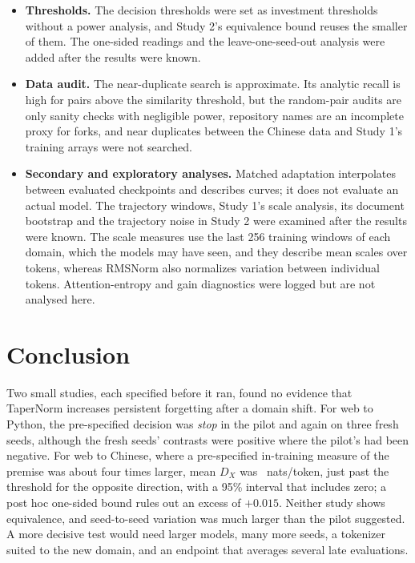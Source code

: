 \documentclass[11pt]{article}
\begin{document}
\begin{itemize}[leftmargin=1.4em,itemsep=2pt]
        primary run and the appearance of seed 101's endpoint values in the run's live log
        (\cref{sec:prespec}); the evidence that its analysis was fixed in advance is the configuration hash logged
        before any outcome and the unchanged runner hash. For Study 2, the Bitcoin attestation postdates the
        Chinese endpoints of seeds 101--103, and the earlier bound rests on Kaggle's server-side records
        (\cref{sec:s2prespec}). Git commit dates are set by the author's machine and are not independent
        timestamps.
  \item \textbf{Thresholds.} The decision thresholds were set as investment thresholds without a power analysis,
        and Study 2's equivalence bound reuses the smaller of them. The one-sided readings and the
        leave-one-seed-out analysis were added after the results were known.
  \item \textbf{Data audit.} The near-duplicate search is approximate. Its analytic recall is high for pairs above
        the similarity threshold, but the random-pair audits are only sanity checks with negligible power,
        repository names are an incomplete proxy for forks, and near duplicates between the Chinese data and
        Study 1's training arrays were not searched.
  \item \textbf{Secondary and exploratory analyses.} Matched adaptation interpolates between evaluated
        checkpoints and describes curves; it does not evaluate an actual model. The trajectory windows, Study 1's
        scale analysis, its document bootstrap and the trajectory noise in Study 2 were examined after the results
        were known. The scale measures use the last 256 training windows of each domain, which the models may have
        seen, and they describe mean scales over tokens, whereas RMSNorm also normalizes variation between
        individual tokens. Attention-entropy and gain diagnostics were logged but are not analysed here.
\end{itemize}

\section{Conclusion}

Two small studies, each specified before it ran, found no evidence that TaperNorm increases persistent forgetting
after a domain shift. For web to Python, the pre-specified decision was \emph{stop} in the pilot and again on
three fresh seeds, although the fresh seeds' contrasts were positive where the pilot's had been negative. For web
to Chinese, where a pre-specified in-training measure of the premise was about four times larger, mean $D_X$ was
\twoDmean{}~nats/token, just past the threshold for the opposite direction, with a 95\% interval that includes
zero; a post hoc one-sided bound rules out an excess of $+0.015$. Neither study shows equivalence, and
seed-to-seed variation was much larger than the pilot suggested. A
more decisive test would need larger models, many more seeds, a tokenizer suited to the new domain, and an
endpoint that averages several late evaluations.
\end{document}

